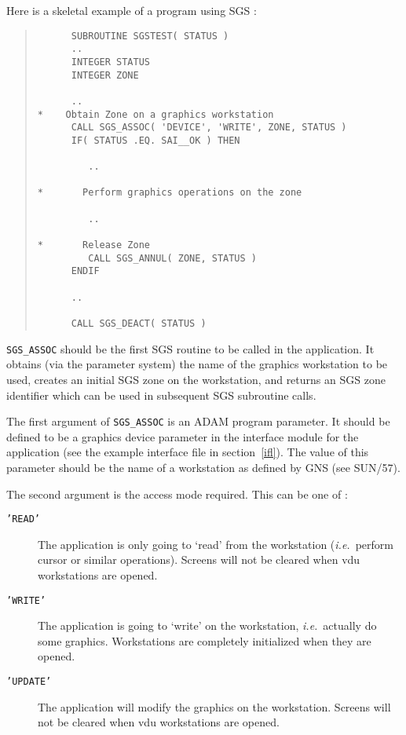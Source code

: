 Here is a skeletal example of a program using SGS :
\begin{quote}
\begin{verbatim}
      SUBROUTINE SGSTEST( STATUS )
      ..
      INTEGER STATUS
      INTEGER ZONE

      ..
*    Obtain Zone on a graphics workstation
      CALL SGS_ASSOC( 'DEVICE', 'WRITE', ZONE, STATUS )
      IF( STATUS .EQ. SAI__OK ) THEN

         ..

*       Perform graphics operations on the zone

         ..

*       Release Zone
         CALL SGS_ANNUL( ZONE, STATUS )
      ENDIF

      ..

      CALL SGS_DEACT( STATUS )

\end{verbatim}
\end{quote}

{\tt SGS\_ASSOC} should be the first SGS routine to be called in the 
application.
It obtains (via the parameter system) the name of the graphics workstation 
to be used, creates an initial SGS zone on the workstation, and returns an
SGS zone identifier which can be used in subsequent SGS subroutine calls.

The first argument of {\tt SGS\_ASSOC} is an ADAM program parameter. 
It should be
defined to be a graphics device parameter in the interface module for the
application (see the example interface file in section~\ref{ifl}). The value of
this parameter should be the name of a workstation as defined by GNS (see
SUN/57).

The second argument is the access mode required. This can be one of :
\begin{description}
\item[{\tt 'READ'}] The application is only going to `read' from the workstation
({\em i.e.}\ perform cursor or similar operations). 
Screens will not be cleared when vdu workstations are opened.
\item[{\tt 'WRITE'}] The application is going to `write' on the workstation,
{\em i.e.}\ actually do some graphics. 
Workstations are completely initialized when they are opened.
\item[{\tt 'UPDATE'}] The application will modify the graphics on the 
workstation.
Screens will not be cleared when vdu workstations are opened.
\end{description}

